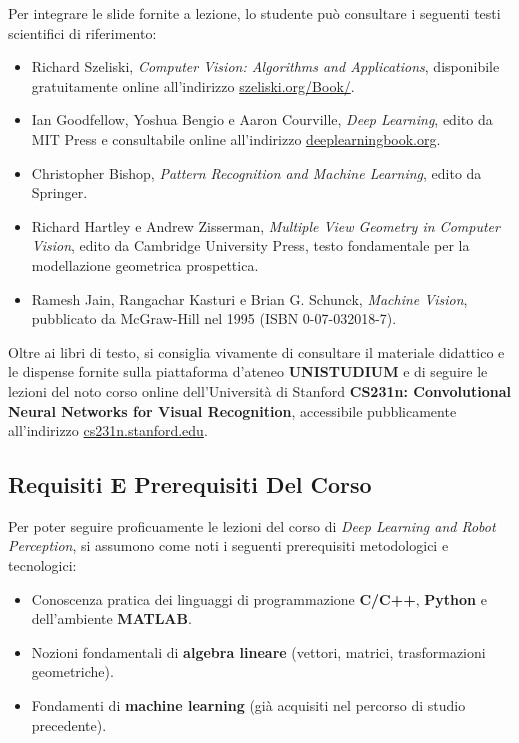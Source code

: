 ﻿\documentclass[11pt, a4paper]{article}
\begin{document}
Per integrare le slide fornite a lezione, lo studente può consultare i seguenti testi scientifici di riferimento:
\begin{itemize}[noitemsep]
    \item Richard Szeliski, \emph{Computer Vision: Algorithms and Applications}, disponibile gratuitamente online all'indirizzo \href{http://szeliski.org/Book/}{szeliski.org/Book/}.
    \item Ian Goodfellow, Yoshua Bengio e Aaron Courville, \emph{Deep Learning}, edito da MIT Press e consultabile online all'indirizzo \href{http://www.deeplearningbook.org/}{deeplearningbook.org}.
    \item Christopher Bishop, \emph{Pattern Recognition and Machine Learning}, edito da Springer.
    \item Richard Hartley e Andrew Zisserman, \emph{Multiple View Geometry in Computer Vision}, edito da Cambridge University Press, testo fondamentale per la modellazione geometrica prospettica.
    \item Ramesh Jain, Rangachar Kasturi e Brian G. Schunck, \emph{Machine Vision}, pubblicato da McGraw-Hill nel 1995 (ISBN 0-07-032018-7).
\end{itemize}




Oltre ai libri di testo, si consiglia vivamente di consultare il materiale didattico e le dispense fornite sulla piattaforma d'ateneo \textbf{UNISTUDIUM} e di seguire le lezioni del noto corso online dell'Università di Stanford \textbf{CS231n: Convolutional Neural Networks for Visual Recognition}, accessibile pubblicamente all'indirizzo \href{http://cs231n.stanford.edu/}{cs231n.stanford.edu}.

\subsection{Requisiti E Prerequisiti Del Corso}

Per poter seguire proficuamente le lezioni del corso di \emph{Deep Learning and Robot Perception}, si assumono come noti i seguenti prerequisiti metodologici e tecnologici:
\begin{itemize}[noitemsep]
    \item Conoscenza pratica dei linguaggi di programmazione \textbf{C/C++}, \textbf{Python} e dell'ambiente \textbf{MATLAB}.
    \item Nozioni fondamentali di \textbf{algebra lineare} (vettori, matrici, trasformazioni geometriche).
    \item Fondamenti di \textbf{machine learning} (già acquisiti nel percorso di studio precedente).
\end{itemize}
\end{document}
